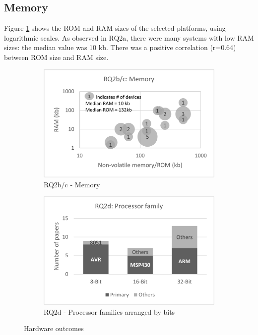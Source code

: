 \documentclass[format=acmsmall, review=false, screen=false]{acmart}
\begin{document}
\subsection{Memory}

Figure \ref{fig:rq2bc} shows the ROM and RAM sizes of the selected platforms, using logarithmic scales. As observed in RQ2a, there were many systems with low RAM sizes: the median value was 10 kb. There was a positive correlation (r=0.64) between ROM size and RAM size.

\begin{figure}[h]
	\centering
	\begin{subfigure}[h]{0.46\textwidth}
		\centering
		\includegraphics[width=\textwidth]{RQ2b-c-Memory}
		\caption{RQ2b/c - Memory}
		\label{fig:rq2bc}
	\end{subfigure}
	\begin{subfigure}[h]{0.46\textwidth}
		\centering
		\includegraphics[width=\textwidth]{RQ2d-Processor-families-arranged-by-bits}
		\caption{RQ2d - Processor families arranged by bits}
		\label{fig:rq2d}
	\end{subfigure}
	\caption{Hardware outcomes}
\end{figure}
\end{document}

